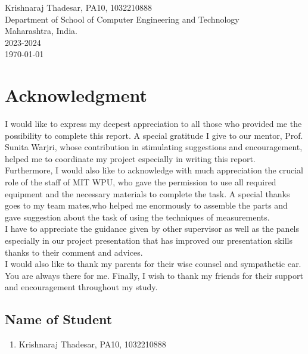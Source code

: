 \documentclass[openany]{report}
\begin{document}
\begin{titlepage}
    \Large{
        Krishnaraj Thadesar, PA10, 1032210888\\
    }
    \vspace{0.5\baselineskip} %
    \LARGE{
        Department of School of Computer Engineering and Technology\\
        Maharashtra, India.\\
        2023-2024\\
    }
    \today

\end{titlepage}


\tableofcontents
\thispagestyle{empty}
\clearpage

\chapter*{Acknowledgment}
\thispagestyle{empty}

I would like to express my deepest appreciation to all those who provided me the possibility to complete this report. A special gratitude I give to our mentor, Prof. Sunita Warjri, whose contribution in stimulating suggestions and encouragement, helped me to coordinate my project especially in writing this report.\\

Furthermore, I would also like to acknowledge with much appreciation the crucial role of the staff of MIT WPU, who gave the permission to use all required equipment and the necessary materials to complete the task. A special thanks goes to my team mates,who helped me enormously to assemble the parts and gave suggestion about the task of using the techniques of measurements.\\

I have to appreciate the guidance given by other supervisor as well as the panels especially in our project presentation that has improved our presentation skills thanks to their comment and advices.\\

I would also like to thank my parents for their wise counsel and sympathetic ear. You are always there for me. Finally, I wish to thank my friends for their support and encouragement throughout my study.



\section*{Name of Student}
\begin{enumerate}
    \item Krishnaraj Thadesar, PA10, 1032210888
\end{enumerate}
\end{document}
